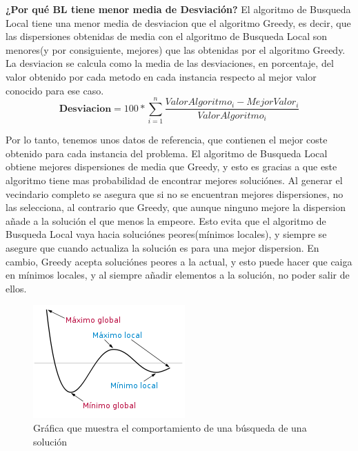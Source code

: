 \documentclass{article}
\begin{document}
\textbf{¿Por qué BL tiene menor media de Desviación?}
\newline El algoritmo de Busqueda Local tiene una menor media de desviacion que el algoritmo 
Greedy, es decir, que las dispersiones obtenidas de media con el algoritmo de Busqueda Local son 
menores(y por consiguiente, mejores) que las obtenidas por el algoritmo Greedy.
La desviacion se calcula como la media de las desviaciones, en porcentaje, del valor obtenido 
por cada metodo en cada instancia respecto al mejor valor conocido para ese caso.
\vspace{10mm}
\begin{equation}
  \textbf{Desviacion} = 
  100*\sum_{i=1}^n
  \frac{ValorAlgoritmo_i - MejorValor_i}{ValorAlgoritmo_i}
\end{equation}

\vspace{10mm}
Por lo tanto, tenemos unos datos de referencia, que contienen el mejor coste obtenido para 
cada instancia del problema.
El algoritmo de Busqueda Local obtiene mejores dispersiones de media que Greedy, y esto es gracias a que 
este algoritmo tiene mas probabilidad de encontrar mejores soluciónes.
\newline Al generar el vecindario completo se asegura que si no se encuentran mejores 
dispersiones, no las selecciona, al contrario que Greedy, que aunque ninguno mejore la dispersion 
añade a la solución el que menos la empeore.
\newline Esto evita que el algoritmo de Busqueda Local vaya hacia soluciónes peores(mínimos locales), y siempre 
se asegure que cuando actualiza la solución es para una mejor dispersion. 
\newpage En cambio, Greedy acepta soluciónes peores a la actual, y esto puede hacer que caiga en mínimos locales,
y al siempre añadir elementos a la solución, no poder salir de ellos.

\begin{figure}[h]
  \centering
  \includegraphics[scale=0.5]{MinLocal.png}
  \caption{Gráfica que muestra el comportamiento de una búsqueda de una solución}
\end{figure}
\end{document}
